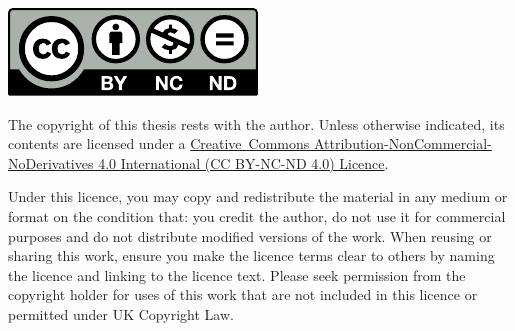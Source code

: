 \noindent
\begin{minipage}[b]{0.3275\textwidth}
    \noindent \raggedright \includegraphics[width=\linewidth]{chapters/backmatter/doclicense-CC-by-nc-nd.pdf}
\end{minipage}
\hfill
\hspace*{0.0225\textwidth}
\begin{minipage}[b]{0.65\textwidth}
    The    copyright    of    this     thesis    rests    with    the    author.
    Unless   otherwise    indicated,   its    contents   are    licensed   under
    a   \href{https://creativecommons.org/licenses/by-nc-nd/4.0/}{\mbox{Creative
    Commons}   Attribution-NonCommercial-NoDerivatives  4.0   International  (CC
    BY-NC-ND 4.0) Licence}.
\end{minipage}

\noindent Under this licence, you may  copy and redistribute the material in any
medium or format on the condition that: you credit the author, do not use it for
commercial purposes  and do not distribute  modified versions of the  work. When
reusing or sharing this work, ensure you  make the licence terms clear to others
by naming  the licence and linking  to the licence text.  Please seek permission
from the copyright  holder for uses of  this work that are not  included in this
licence or permitted under UK Copyright Law.

\vfill

